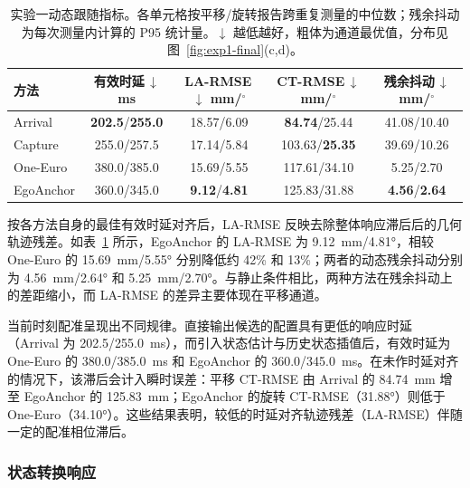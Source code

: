 \documentclass[review]{vgtc}
\begin{document}
\begin{table}[t]
\centering
\caption{实验一动态跟随指标。各单元格按平移/旋转报告跨重复测量的中位数；残余抖动为每次测量内计算的 P95 统计量。$\downarrow$ 越低越好，粗体为通道最优值，分布见图~\ref{fig:exp1-final}(c,d)。}
\label{tab:exp1-dynamic}
\setlength{\tabcolsep}{2pt}
\begin{tabular}{@{}lcccc@{}}
\toprule
方法 & \shortstack{有效时延\,$\downarrow$\\ms} & \shortstack{LA-RMSE\,$\downarrow$\\mm/$^\circ$} & \shortstack{CT-RMSE\,$\downarrow$\\mm/$^\circ$} & \shortstack{残余抖动\,$\downarrow$\\mm/$^\circ$} \\
\midrule
Arrival   & \textbf{202.5}/\textbf{255.0} & 18.57/6.09 & \textbf{84.74}/25.44 & 41.08/10.40 \\
Capture   & 255.0/257.5 & 17.14/5.84 & 103.63/\textbf{25.35} & 39.69/10.26 \\
One-Euro  & 380.0/385.0 & 15.69/5.55 & 117.61/34.10 & 5.25/2.70 \\
EgoAnchor & 360.0/345.0 & \textbf{9.12}/\textbf{4.81} & 125.83/31.88 & \textbf{4.56}/\textbf{2.64} \\
\bottomrule
\end{tabular}
\end{table}

按各方法自身的最佳有效时延对齐后，LA-RMSE 反映去除整体响应滞后后的几何轨迹残差。如表~\ref{tab:exp1-dynamic} 所示，EgoAnchor 的 LA-RMSE 为 9.12~mm/4.81°，相较 One-Euro 的 15.69~mm/5.55° 分别降低约 42\% 和 13\%；两者的动态残余抖动分别为 4.56~mm/2.64° 和 5.25~mm/2.70°。与静止条件相比，两种方法在残余抖动上的差距缩小，而 LA-RMSE 的差异主要体现在平移通道。

当前时刻配准呈现出不同规律。直接输出候选的配置具有更低的响应时延（Arrival 为 202.5/255.0~ms），而引入状态估计与历史状态插值后，有效时延为 One-Euro 的 380.0/385.0~ms 和 EgoAnchor 的 360.0/345.0~ms。在未作时延对齐的情况下，该滞后会计入瞬时误差：平移 CT-RMSE 由 Arrival 的 84.74~mm 增至 EgoAnchor 的 125.83~mm；EgoAnchor 的旋转 CT-RMSE（31.88°）则低于 One-Euro（34.10°）。这些结果表明，较低的时延对齐轨迹残差（LA-RMSE）伴随一定的配准相位滞后。

\subsubsection{状态转换响应}
\end{document}
